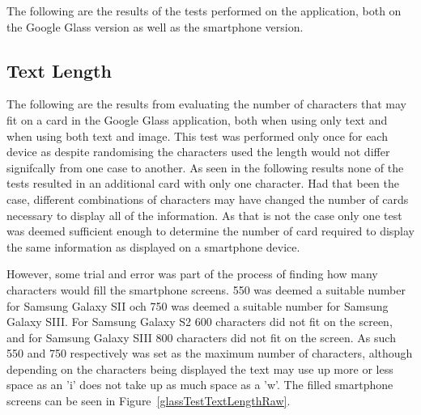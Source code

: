 The following are the results of the tests performed on the application, both on the Google Glass version as well as the smartphone version.

\subsection{Text Length}
The following are the results from evaluating the number of characters that may fit on a card in the Google Glass application, both when using only text and when using both text and image. This test was performed only once for each device as despite randomising the characters used the length would not differ signifcally from one case to another. As seen in the following results none of the tests resulted in an additional card with only one character. Had that been the case, different combinations of characters may have changed the number of cards necessary to display all of the information. As that is not the case only one test was deemed sufficient enough to determine the number of card required to display the same information as displayed on a smartphone device.

However, some trial and error was part of the process of finding how many characters would fill the smartphone screens. 550 was deemed a suitable number for Samsung Galaxy SII och 750 was deemed a suitable number for Samsung Galaxy SIII. For Samsung Galaxy S2 600 characters did not fit on the screen, and for Samsung Galaxy SIII 800 characters did not fit on the screen. As such 550 and 750 respectively was set as the maximum number of characters, although depending on the characters being displayed the text may use up more or less space as an 'i' does not take up as much space as a 'w'. The filled smartphone screens can be seen in Figure~\ref{glassTestTextLengthRaw}.

